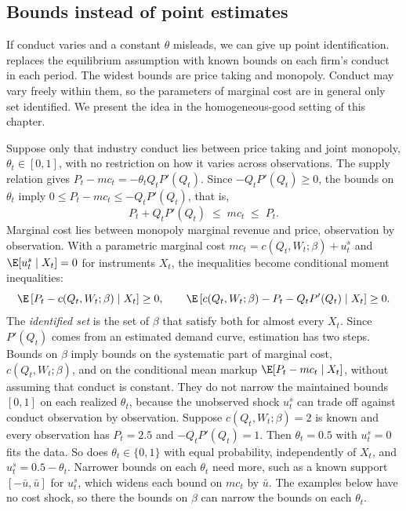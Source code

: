 \subsection{Bounds instead of point estimates}\label{sec:03-bounds}

If conduct varies and a constant $\theta$ misleads, we can give up point identification. \citet[Section~2.2]{Rosen2007}
replaces the equilibrium assumption with known bounds on each firm's conduct in each period. The widest bounds are price
taking and monopoly. Conduct may vary freely within them, so the parameters of marginal cost are in general only set identified.
We present the idea in the homogeneous-good setting of this chapter.

Suppose only that industry conduct lies between price taking and joint monopoly, $\theta_t \in [0, 1]$, with no restriction
on how it varies across observations. The supply relation gives $P_t - mc_t = -\theta_t Q_t P'(Q_t)$. Since $-Q_tP'(Q_t)
\ge 0$, the bounds on $\theta_t$ imply $0 \le P_t - mc_t \le -Q_t P'(Q_t)$, that is,
\begin{equation}\label{eq:03-rosen-ineq}
P_t + Q_t P'(Q_t) \;\le\; mc_t \;\le\; P_t .
\end{equation}
Marginal cost lies between monopoly marginal revenue and price, observation by observation. With a parametric marginal
cost $mc_t = c(Q_t, W_t; \beta) + u^s_t$ and $\E[u^s_t \mid X_t] = 0$ for instruments $X_t$, the inequalities become
conditional moment inequalities:
\begin{equation*}
\E\left[P_t - c(Q_t, W_t; \beta) \mid X_t\right] \ge 0, \qquad
\E\left[c(Q_t, W_t; \beta) - P_t - Q_t P'(Q_t) \mid X_t\right] \ge 0 .
\end{equation*}
The \emph{identified set} is the set of $\beta$ that satisfy both for almost every $X_t$. Since $P'(Q_t)$ comes from an
estimated demand curve, estimation has two steps. Bounds on $\beta$ imply bounds on the systematic part of marginal cost,
$c(Q_t, W_t; \beta)$, and on the conditional mean markup $\E[P_t - mc_t \mid X_t]$, without assuming that conduct is
constant. They do not narrow the maintained bounds $[0, 1]$ on each realized $\theta_t$, because the unobserved shock $u^s_t$ can trade off against conduct
observation by observation. Suppose $c(Q_t, W_t; \beta) = 2$ is known and every observation has $P_t = 2.5$ and
$-Q_tP'(Q_t) = 1$. Then $\theta_t = 0.5$ with $u^s_t = 0$ fits the data. So does $\theta_t \in \{0, 1\}$ with equal
probability, independently of $X_t$, and $u^s_t = 0.5 - \theta_t$. Narrower bounds on each $\theta_t$ need more, such as a known support $[-\bar u, \bar
u]$ for $u^s_t$, which widens each bound on $mc_t$ by $\bar u$. The examples below have no cost shock, so there the
bounds on $\beta$ can narrow the bounds on each $\theta_t$.

